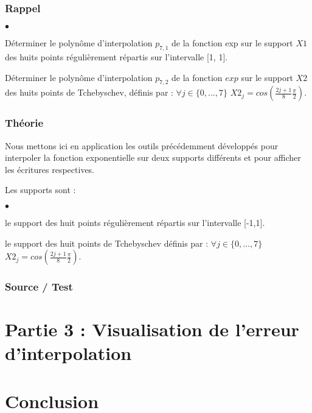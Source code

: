 \documentclass[a4paper,10pt]{report}
\begin{document}
\subsection*{Rappel}

\begin{list}{}{}
\item \begin{list}{$\bullet$}{}
\item Déterminer le polynôme d’interpolation $p_{7,1}$ de la fonction exp sur
le support $X1$ des huits points régulièrement répartis sur l’intervalle [1, 1].
\item Déterminer le polynôme d’interpolation $p_{7,2}$ de la fonction $exp$ sur le
support $X2$ des huits points de Tchebyschev, définis par : $\forall j \in \lbrace 0,...,7 \rbrace$  $X2_{j} = cos(\frac{2j+1}{8} \frac{\pi}{2}).$
\end{list}
\end{list}

\subsection*{Théorie}

Nous mettons ici en application les outils précédemment développés pour interpoler la fonction exponentielle sur deux supports différents et pour afficher les écritures respectives.

Les supports sont :
\begin{list}{}{}
\item \begin{list}{$\bullet$}{}
\item le support des huit points régulièrement répartis sur l’intervalle [-1,1].
\item le support des huit points de Tchebyschev définis par : $\forall j \in \lbrace 0,...,7 \rbrace$  $X2_{j} = cos(\frac{2j+1}{8} \frac{\pi}{2}).$

\end{list}
\end{list}

\newpage
\subsection*{Source / Test}

\begin{center}
	
\end{center}

\chapter*{Partie 3 : Visualisation de l’erreur d’interpolation}

\chapter*{Conclusion}
\end{document}

